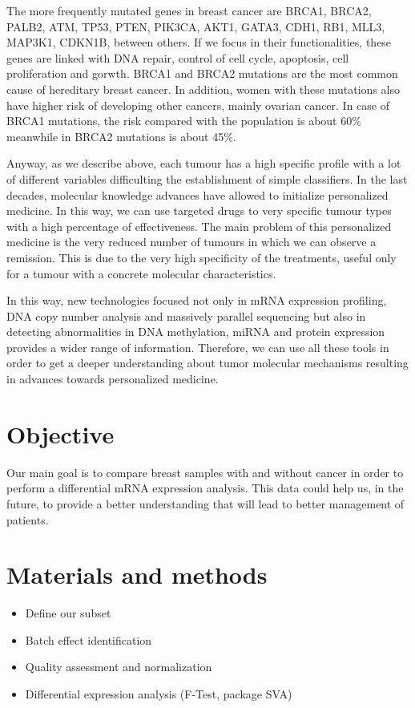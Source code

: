 \documentclass{article}
\begin{document}
The more frequently mutated genes in breast cancer are BRCA1, BRCA2, PALB2, ATM, TP53, PTEN, PIK3CA, AKT1, GATA3, CDH1, RB1, MLL3, MAP3K1, CDKN1B, between others\cite{acs}. If we focus in their functionalities, these genes are linked with DNA repair, control of cell cycle, apoptosis, cell proliferation and gorwth. BRCA1 and BRCA2 mutations are the most common cause of hereditary breast cancer\cite{acs}. In addition, women with these mutations also have higher risk of developing other cancers, mainly ovarian cancer\cite{acs}. In case of BRCA1 mutations, the risk compared with the population is about 60\% meanwhile in BRCA2 mutations is about 45\%\cite{acs}. 

\vspace{10pt}
Anyway, as we describe above, each tumour has a high specific profile with a lot of different variables difficulting the establishment of simple classifiers. In the last decades, molecular knowledge advances have allowed to initialize personalized medicine. In this way, we can use targeted drugs to very specific tumour types with a high percentage of effectiveness. The main problem of this personalized medicine is the very reduced number of tumours in which we can observe a remission. This is due to the very high specificity of the treatments, useful only for a tumour with a concrete molecular characteristics. 

In this way, new technologies focused not only in mRNA expression profiling, DNA copy number analysis and massively parallel sequencing but also in detecting abnormalities in DNA methylation, miRNA and protein expression provides a wider range of information\cite{cangen}. Therefore, we can use all these tools in order to get a deeper understanding about tumor molecular mechanisms resulting in advances towards personalized medicine.

\section*{Objective}
Our main goal is to compare breast samples with and without cancer in order to perform a differential mRNA expression analysis. This data could help us, in the future, to provide a better understanding that will lead to better management of patients.
\section*{Materials and methods}

\begin{itemize}
  \item Define our subset
  \item Batch effect identification
  \item Quality assessment and normalization
  \item Differential expression analysis (F-Test, package SVA)
  
\end{itemize}
\end{document}
